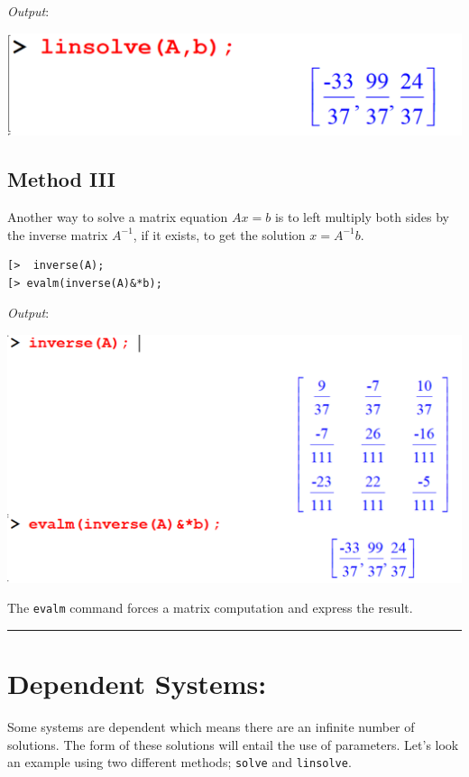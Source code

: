 \documentclass[
]{book}
\theoremstyle{definition}
\theoremstyle{definition}
\theoremstyle{definition}
\theoremstyle{definition}
\theoremstyle{remark}
\begin{document}
\emph{Output}:

\includegraphics{figures/Lesson 5/fig7.png}

\subsection{Method III}\label{method-iii}

Another way to solve a matrix equation \(Ax = b\) is to left multiply both sides by the inverse matrix \(A^{-1}\), if it exists, to get the solution \(x = A^{-1}b\).

\begin{verbatim}
[>  inverse(A);
[> evalm(inverse(A)&*b);
\end{verbatim}

\emph{Output}:

\includegraphics{figures/Lesson 5/fig8.png}

The \texttt{evalm} command forces a matrix computation and express the result.

\begin{center}\rule{0.5\linewidth}{0.5pt}\end{center}

\section{Dependent Systems:}\label{dependent-systems}

Some systems are dependent which means there are an infinite number of solutions. The form of these solutions will entail the use of parameters.
Let's look an example using two different methods; \texttt{solve} and \texttt{linsolve}.
\end{document}
